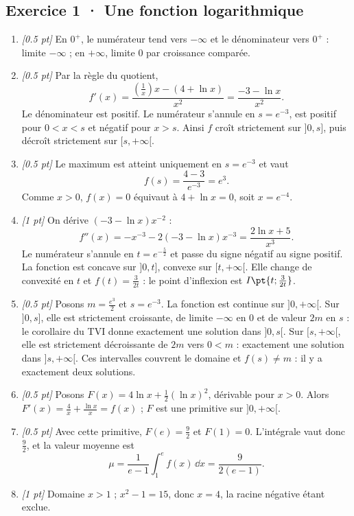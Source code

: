 \subsection*{Exercice 1 · Une fonction logarithmique}\begin{enumerate}

\item \textit{[\num{0,5} pt]} En $0^+$, le numérateur tend vers $-\infty$ et le dénominateur vers $0^+$ : limite $-\infty$ ; en $+\infty$, limite $0$ par croissance comparée.

\item \textit{[\num{0,5} pt]} Par la règle du quotient,
\[f'(x)=\frac{(\frac{1}{x})x-(4+\ln x)}{x^2}=\frac{-3-\ln x}{x^2}.\]
Le dénominateur est positif. Le numérateur s'annule en $s=e^{-3}$, est positif pour $0<x<s$ et négatif pour $x>s$. Ainsi $f$ croît strictement sur $]0,s]$, puis décroît strictement sur $[s,+\infty[$.

\item \textit{[\num{0,5} pt]} Le maximum est atteint uniquement en $s=e^{-3}$ et vaut
\[f(s)=\frac{4- 3}{e^{-3}}=e^{3}.\]
Comme $x>0$, $f(x)=0$ équivaut à $4+\ln x=0$, soit $x=e^{-4}$.

\item \textit{[1 pt]} On dérive $(-3-\ln x)x^{-2}$ :
\[f''(x)=-x^{-3}-2(-3-\ln x)x^{-3}=\frac{2\ln x+5}{x^3}.\]
Le numérateur s'annule en $t=e^{-\frac{5}{2}}$ et passe du signe négatif au signe positif. La fonction est concave sur $]0,t]$, convexe sur $[t,+\infty[$. Elle change de convexité en $t$ et $f(t)=\frac{3}{2t}$ : le point d'inflexion est $I\pt{t;\frac{3}{2t}}$.

\item \textit{[\num{0,5} pt]} Posons $m=\frac{e^{3}}{2}$ et $s=e^{-3}$. La fonction est continue sur $]0,+\infty[$. Sur $]0,s]$, elle est strictement croissante, de limite $-\infty$ en $0$ et de valeur $2m$ en $s$ : le corollaire du TVI donne exactement une solution dans $]0,s[$. Sur $[s,+\infty[$, elle est strictement décroissante de $2m$ vers $0<m$ : exactement une solution dans $]s,+\infty[$. Ces intervalles couvrent le domaine et $f(s)\ne m$ : il y a exactement deux solutions.

\item \textit{[\num{0,5} pt]} Posons $F(x)=4\ln x+\frac12(\ln x)^2$, dérivable pour $x>0$. Alors $F'(x)=\frac{4}{x}+\frac{\ln x}{x}=f(x)$ ; $F$ est une primitive sur $]0,+\infty[$.

\item \textit{[\num{0,5} pt]} Avec cette primitive, $F(e)=\frac{9}{2}$ et $F(1)=0$. L'intégrale vaut donc $\frac{9}{2}$, et la valeur moyenne est
\[\mu=\frac{1}{e-1}\int_1^e f(x)\,\dd x=\frac{9}{2(e-1)}.\]

\item \textit{[1 pt]} Domaine $x>1$ ; $x^2-1=15$, donc $x=4$, la racine négative étant exclue.

\end{enumerate}

